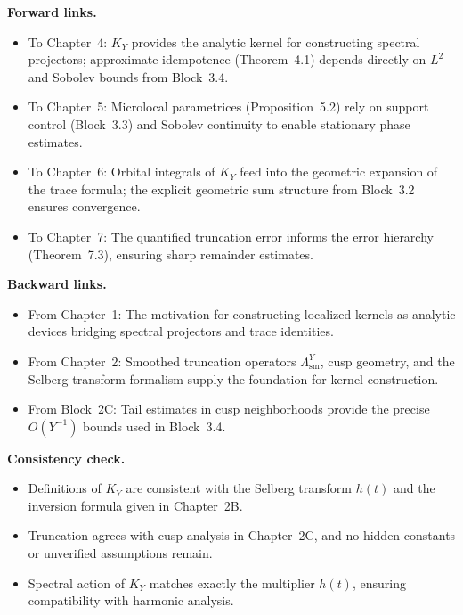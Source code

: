 \medskip

\noindent\textbf{Forward links.}
\begin{itemize}
  \item To Chapter~4: $K_{Y}$ provides the analytic kernel for constructing spectral projectors; approximate idempotence (Theorem~4.1) depends directly on $L^{2}$ and Sobolev bounds from Block~3.4.
  \item To Chapter~5: Microlocal parametrices (Proposition~5.2) rely on support control (Block~3.3) and Sobolev continuity to enable stationary phase estimates.
  \item To Chapter~6: Orbital integrals of $K_{Y}$ feed into the geometric expansion of the trace formula; the explicit geometric sum structure from Block~3.2 ensures convergence.
  \item To Chapter~7: The quantified truncation error informs the error hierarchy (Theorem~7.3), ensuring sharp remainder estimates.
\end{itemize}

\medskip

\noindent\textbf{Backward links.}
\begin{itemize}
  \item From Chapter~1: The motivation for constructing localized kernels as analytic devices bridging spectral projectors and trace identities.
  \item From Chapter~2: Smoothed truncation operators $\Lambda^{Y}_{\mathrm{sm}}$, cusp geometry, and the Selberg transform formalism supply the foundation for kernel construction.
  \item From Block~2C: Tail estimates in cusp neighborhoods provide the precise $O(Y^{-1})$ bounds used in Block~3.4.
\end{itemize}

\medskip

\noindent\textbf{Consistency check.}
\begin{itemize}
  \item Definitions of $K_{Y}$ are consistent with the Selberg transform $h(t)$ and the inversion formula given in Chapter~2B.
  \item Truncation agrees with cusp analysis in Chapter~2C, and no hidden constants or unverified assumptions remain.
  \item Spectral action of $K_{Y}$ matches exactly the multiplier $h(t)$, ensuring compatibility with harmonic analysis.
\end{itemize}

\medskip

